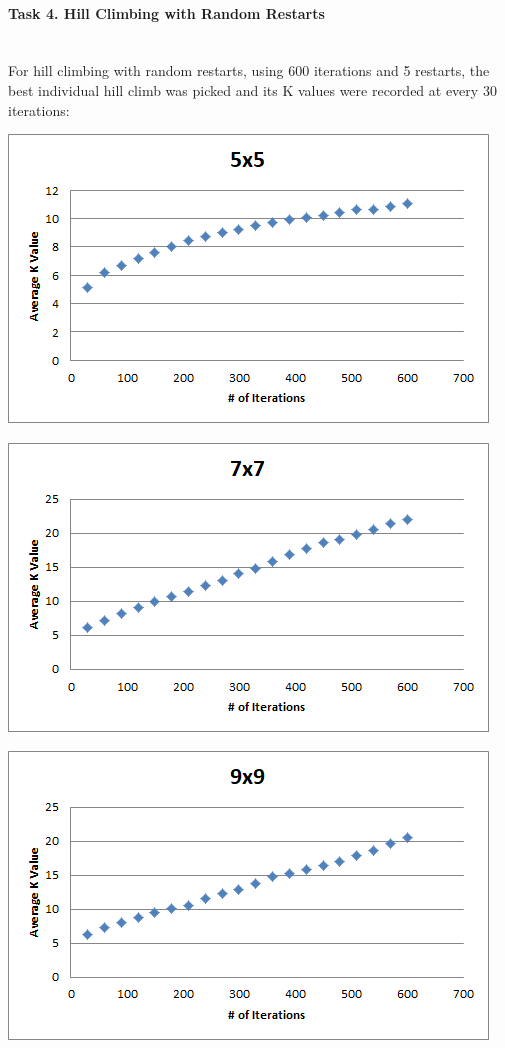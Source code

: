 \documentclass[12pt, letterpaper]{article}
\begin{document}
\pagebreak
\paragraph{Task 4. Hill Climbing with Random Restarts} \mbox{}\\

For hill climbing with random restarts, using 600 iterations and 5 restarts, the best individual hill climb was picked and its K values were recorded at every 30 iterations:

\includegraphics[width=\linewidth]{"Task 4/5x5 Scatterplot"}

\bigskip

\includegraphics[width=\linewidth]{"Task 4/7x7 Scatterplot"}

\bigskip

\includegraphics[width=\linewidth]{"Task 4/9x9 Scatterplot"}
\end{document}
